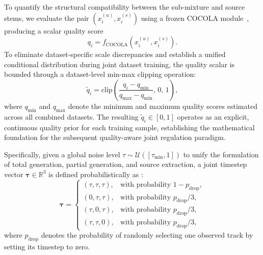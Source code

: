 \documentclass[lettersize,journal]{IEEEtran}
\begin{document}
To quantify the structural compatibility between the sub-mixture and source stems, we evaluate the pair
  $(x_i^{(u)},x_i^{(s)})$ 
using a frozen COCOLA module~\cite{ciranni2025cocola}, producing a scalar quality score
  \begin{equation}
    q_i=f_{\mathrm{COCOLA}}(x_i^{(u)},x_i^{(s)}).
  \end{equation}
To eliminate dataset-specific scale discrepancies and establish a unified conditional distribution during joint dataset training, the quality scalar is bounded through a dataset-level min-max clipping operation:
  \begin{equation}
    \tilde{q}_i=
    \mathrm{clip}\!\left(
    \frac{q_i-q_{\min}}{q_{\max}-q_{\min}},\,0,\,1
    \right),
  \end{equation}
where $q_{\min}$ and $q_{\max}$ denote the minimum and maximum quality scores estimated across all combined datasets. The resulting $\tilde{q}_i\in[0,1]$ operates as an explicit, continuous quality prior for each training sample, establishing the mathematical foundation for the subsequent quality-aware joint regulation paradigm.

Specifically, given a global noise level $\tau \sim \mathcal{U}([\tau_{\min},1])$ to unify the formulation of total generation, partial generation, and source extraction, a joint timestep vector $\boldsymbol{\tau}\in\mathbb{R}^{3}$  is defined probabilistically as \cite{chae2025mge}:
  \begin{equation}
    \boldsymbol{\tau}=
    \begin{cases}
    (\tau,\tau,\tau), & \text{with probability } 1-p_{\mathrm{drop}},\\
    (0,\tau,\tau), & \text{with probability } p_{\mathrm{drop}}/3,\\
    (\tau,0,\tau), & \text{with probability } p_{\mathrm{drop}}/3,\\
    (\tau,\tau,0), & \text{with probability } p_{\mathrm{drop}}/3,
  \end{cases}
  \end{equation}
where $p_{\mathrm{drop}}$ denotes the probability of randomly selecting one observed track by setting its timestep to zero.
\end{document}
